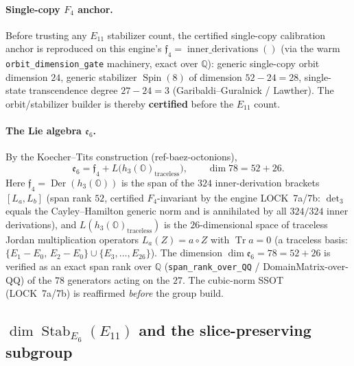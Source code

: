 \paragraph{Single-copy $F_4$ anchor.}
Before trusting any $E_{11}$ stabilizer count, the certified single-copy calibration
anchor is reproduced on this engine's $\mathfrak{f}_4 = \operatorname{inner\_derivations}()$
(via the warm \texttt{orbit\_dimension\_gate} machinery, exact over $\mathbb{Q}$):
generic single-copy orbit dimension $24$, generic stabilizer $\operatorname{Spin}(8)$
of dimension $52-24=28$, single-state transcendence degree $27-24=3$
(Garibaldi--Guralnick / Lawther). The orbit/stabilizer builder is thereby
\textbf{certified} before the $E_{11}$ count.

\paragraph{The Lie algebra $\mathfrak{e}_6$.}
By the Koecher--Tits construction (ref-baez-octonions),
\begin{equation}
\boxed{\ \mathfrak{e}_6 = \mathfrak{f}_4 + L\bigl(h_3(\mathbb{O})_{\mathrm{traceless}}\bigr),
\qquad \dim 78 = 52 + 26.\ }
\label{eq:e6-build}
\end{equation}
Here $\mathfrak{f}_4 = \operatorname{Der}(h_3(\mathbb{O}))$ is the span of the $324$
inner-derivation brackets $[L_a,L_b]$ (span rank $52$, certified $F_4$-invariant by
the engine LOCK~7a/7b: $\det_3$ equals the Cayley--Hamilton generic norm and is
annihilated by all $324/324$ inner derivations), and $L(h_3(\mathbb{O})_{\mathrm{traceless}})$
is the $26$-dimensional space of traceless Jordan multiplication operators
$L_a(Z)=a\circ Z$ with $\operatorname{Tr} a = 0$ (a traceless basis:
$\{E_1-E_0,\,E_2-E_0\}\cup\{E_3,\dots,E_{26}\}$). The dimension
$\dim\mathfrak{e}_6 = 78 = 52+26$ is verified as an exact span rank over $\mathbb{Q}$
(\texttt{span\_rank\_over\_QQ} / DomainMatrix-over-QQ) of the $78$ generators acting
on the $27$. The cubic-norm SSOT (LOCK~7a/7b) is reaffirmed \emph{before} the group
build.

\subsection{$\dim\operatorname{Stab}_{E_6}(E_{11})$ and the slice-preserving subgroup}

